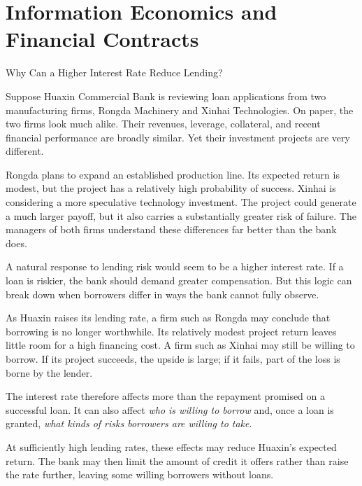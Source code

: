 \chapter{Information Economics and Financial Contracts}
\label{chap:Information_Economics_and_Financial_Contracts}

\begin{openingcase}{Why Can a Higher Interest Rate Reduce Lending?}

Suppose Huaxin Commercial Bank is reviewing loan applications from two manufacturing firms, Rongda Machinery and Xinhai Technologies. On paper, the two firms look much alike. Their revenues, leverage, collateral, and recent financial performance are broadly similar. Yet their investment projects are very different.

Rongda plans to expand an established production line. Its expected return is modest, but the project has a relatively high probability of success. Xinhai is considering a more speculative technology investment. The project could generate a much larger payoff, but it also carries a substantially greater risk of failure. The managers of both firms understand these differences far better than the bank does.

A natural response to lending risk would seem to be a higher interest rate. If a loan is riskier, the bank should demand greater compensation. But this logic can break down when borrowers differ in ways the bank cannot fully observe.

As Huaxin raises its lending rate, a firm such as Rongda may conclude that borrowing is no longer worthwhile. Its relatively modest project return leaves little room for a high financing cost. A firm such as Xinhai may still be willing to borrow. If its project succeeds, the upside is large; if it fails, part of the loss is borne by the lender.

The interest rate therefore affects more than the repayment promised on a successful loan. It can also affect \emph{who is willing to borrow} and, once a loan is granted, \emph{what kinds of risks borrowers are willing to take}.

At sufficiently high lending rates, these effects may reduce Huaxin's expected return. The bank may then limit the amount of credit it offers rather than raise the rate further, leaving some willing borrowers without loans.

\end{openingcase}

